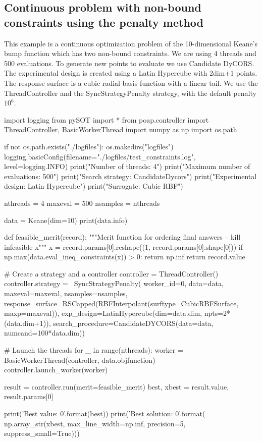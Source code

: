 \documentclass[]{article}
\begin{document}
\subsection{Continuous problem with non-bound constraints using the penalty method}
This example is a continuous optimization problem of the 10-dimensional Keane's bump function which has two non-bound constraints. We are using 4 threads and 500 evaluations. To generate new points to evaluate we use Candidate DyCORS. The experimental design is created using a Latin Hypercube with 2dim+1 points. The response surface is a cubic radial basis function with a linear tail. We use the ThreadController and the SyncStrategyPenalty strategy, with the default penalty $10^6$.

\begin{python}
import logging
from pySOT import *
from poap.controller import ThreadController, BasicWorkerThread
import numpy as np
import os.path

if not os.path.exists("./logfiles"):
    os.makedirs("logfiles")
logging.basicConfig(filename="./logfiles/test_constraints.log",
                    level=logging.INFO)
print("Number of threads: 4")
print("Maximum number of evaluations: 500")
print("Search strategy: CandidateDycors")
print("Experimental design: Latin Hypercube")
print("Surrogate: Cubic RBF")

nthreads = 4
maxeval = 500
nsamples = nthreads

data = Keane(dim=10)
print(data.info)

def feasible_merit(record):
    """Merit function for ordering final answers -- kill infeasible x"""
    x = record.params[0].reshape((1, record.params[0].shape[0]))
    if np.max(data.eval_ineq_constraints(x)) > 0:
        return np.inf
    return record.value

# Create a strategy and a controller
controller = ThreadController()
controller.strategy = \
    SyncStrategyPenalty(
        worker_id=0, data=data,
        maxeval=maxeval, nsamples=nsamples,
        response_surface=RSCapped(RBFInterpolant(surftype=CubicRBFSurface,
                                                 maxp=maxeval)),
        exp_design=LatinHypercube(dim=data.dim, npts=2*(data.dim+1)),
        search_procedure=CandidateDYCORS(data=data, numcand=100*data.dim))

# Launch the threads
for _ in range(nthreads):
    worker = BasicWorkerThread(controller, data.objfunction)
    controller.launch_worker(worker)

result = controller.run(merit=feasible_merit)
best, xbest = result.value, result.params[0]

print('Best value: {0}'.format(best))
print('Best solution: {0}'.format(
    np.array_str(xbest, max_line_width=np.inf,
                 precision=5, suppress_small=True)))
\end{python}
\end{document}
